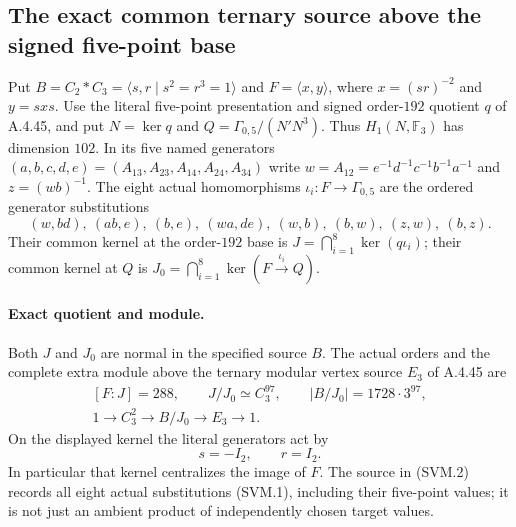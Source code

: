 \subsection{The exact common ternary source above the signed five-point base}

Put $B=C_2*C_3=\langle s,r\mid s^2=r^3=1\rangle$ and
$F=\langle x,y\rangle$, where $x=(sr)^{-2}$ and $y=sxs$.
Use the literal five-point presentation and signed order-$192$ quotient
$q$ of A.4.45, and put $N=\ker q$ and
$Q=\Gamma_{0,5}/(N'N^3)$.  Thus
$H_1(N,\mathbb F_3)$ has dimension $102$.  In its five named generators
$(a,b,c,d,e)=(A_{13},A_{23},A_{14},A_{24},A_{34})$ write
$w=A_{12}=e^{-1}d^{-1}c^{-1}b^{-1}a^{-1}$ and $z=(wb)^{-1}$.
The eight actual homomorphisms $\iota_i:F\to\Gamma_{0,5}$ are the
ordered generator substitutions
\[
 (w,bd),\ (ab,e),\ (b,e),\ (wa,de),\ (w,b),\ (b,w),\ (z,w),\ (b,z).
                                                               \tag{SVM.1}
\]
Their common kernel at the order-$192$ base is
$J=\bigcap_{i=1}^8\ker(q\iota_i)$; their common kernel at $Q$ is
$J_0=\bigcap_{i=1}^8\ker(F\xrightarrow{\iota_i}Q)$.

\paragraph{Exact quotient and module.}
Both $J$ and $J_0$ are normal in the specified source $B$.  The actual
orders and the complete extra module above the ternary modular vertex
source $E_3$ of A.4.45 are
\[
 \begin{gathered}
 [F:J]=288,\qquad J/J_0\simeq C_3^{97},\qquad
 |B/J_0|=1728\cdot3^{97},\\
 1\longrightarrow C_3^2\longrightarrow B/J_0
     \longrightarrow E_3\longrightarrow1.
 \end{gathered}
                                                               \tag{SVM.2}
\]
On the displayed kernel the literal generators act by
\[
                          s=-I_2,\qquad r=I_2.
                                                               \tag{SVM.3}
\]
In particular that kernel centralizes the image of $F$.
The source in (SVM.2) records all eight actual substitutions (SVM.1),
including their five-point values; it is not just an ambient product
of independently chosen target values.

